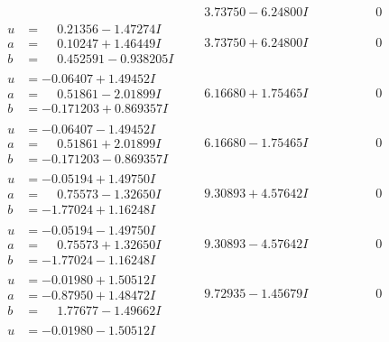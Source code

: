\documentclass[1p]{elsarticle_modified}
\theoremstyle{definition}
\begin{document}
$$\begin{array}{c|c|c}
 & \phantom{-}3.73750 - 6.24800 I & \phantom{-0.000000 } 0 \\ \hline\begin{aligned}
u &= \phantom{-}0.21356 - 1.47274 I \\
a &= \phantom{-}0.10247 + 1.46449 I \\
b &= \phantom{-}0.452591 - 0.938205 I\end{aligned}
 & \phantom{-}3.73750 + 6.24800 I & \phantom{-0.000000 } 0 \\ \hline\begin{aligned}
u &= -0.06407 + 1.49452 I \\
a &= \phantom{-}0.51861 - 2.01899 I \\
b &= -0.171203 + 0.869357 I\end{aligned}
 & \phantom{-}6.16680 + 1.75465 I & \phantom{-0.000000 } 0 \\ \hline\begin{aligned}
u &= -0.06407 - 1.49452 I \\
a &= \phantom{-}0.51861 + 2.01899 I \\
b &= -0.171203 - 0.869357 I\end{aligned}
 & \phantom{-}6.16680 - 1.75465 I & \phantom{-0.000000 } 0 \\ \hline\begin{aligned}
u &= -0.05194 + 1.49750 I \\
a &= \phantom{-}0.75573 - 1.32650 I \\
b &= -1.77024 + 1.16248 I\end{aligned}
 & \phantom{-}9.30893 + 4.57642 I & \phantom{-0.000000 } 0 \\ \hline\begin{aligned}
u &= -0.05194 - 1.49750 I \\
a &= \phantom{-}0.75573 + 1.32650 I \\
b &= -1.77024 - 1.16248 I\end{aligned}
 & \phantom{-}9.30893 - 4.57642 I & \phantom{-0.000000 } 0 \\ \hline\begin{aligned}
u &= -0.01980 + 1.50512 I \\
a &= -0.87950 + 1.48472 I \\
b &= \phantom{-}1.77677 - 1.49662 I\end{aligned}
 & \phantom{-}9.72935 - 1.45679 I & \phantom{-0.000000 } 0 \\ \hline\begin{aligned}
u &= -0.01980 - 1.50512 I \\

\end{aligned}
\end{array}$$
\end{document}
